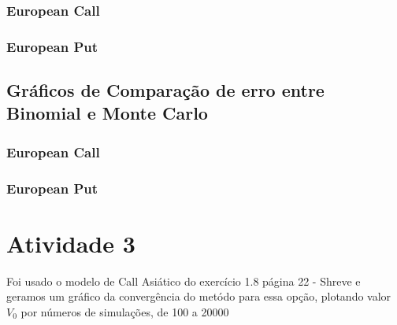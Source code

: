 \documentclass[
	11pt,				%
	openright,			%
	oneside,			%
	a4paper,			%
	english,			%
	french,				%
	spanish,			%
	brazil,				%
	]{abntex2}
\begin{document}
\subsection{European Call}
\begin{figure}[h]
\end{figure}
\newpage
\subsection{European Put}
\begin{figure}[h]
\end{figure}
\newpage
\section{Gráficos de Comparação de erro entre Binomial e Monte Carlo}

\subsection{European Call}

\begin{figure}[h]
\end{figure}
\newpage
\subsection{European Put}

\begin{figure}[h]
\end{figure}


\chapter{Atividade 3}
Foi usado o modelo de Call Asiático do exercício 1.8 página 22 - Shreve e geramos um gráfico da convergência do metódo para essa opção, plotando valor \(V_0\) por números de simulações, de 100 a 20000
\begin{figure}[h]
\end{figure}
\end{document}
